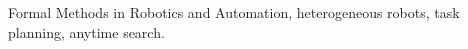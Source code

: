 \documentclass[lettersize,journal]{IEEEtran}
\theoremstyle{italiclemma}
\theoremstyle{italiclemma}
\theoremstyle{definition}
\begin{document}
\begin{abstract}
\end{abstract}

\begin{IEEEkeywords}
Formal Methods in Robotics and Automation, heterogeneous robots, task planning, anytime search.
\end{IEEEkeywords}
\end{document}
